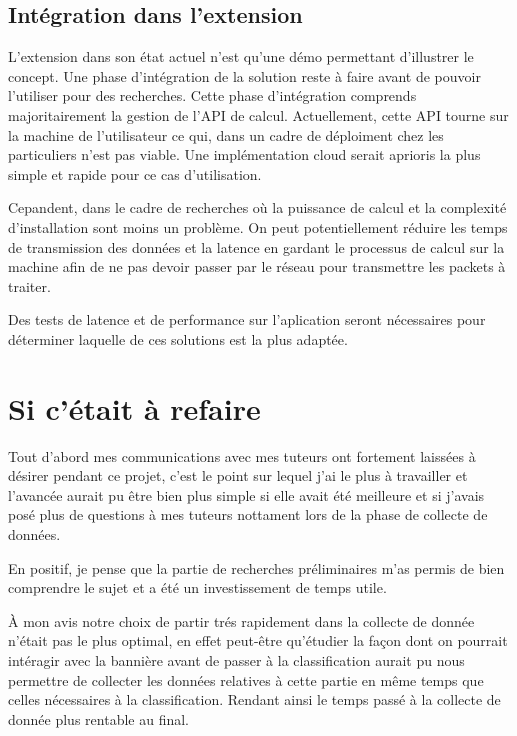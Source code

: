 \documentclass[oneside,a4paper,12pt]{article}
\begin{document}
	\subsection{Intégration dans l'extension}
	
	L'extension dans son état actuel n'est qu'une démo permettant d'illustrer le concept. Une phase d'intégration de la solution reste à faire avant de pouvoir l'utiliser pour des recherches.
	Cette phase d'intégration comprends majoritairement la gestion de l'API de calcul.
	Actuellement, cette API tourne sur la machine de l'utilisateur ce qui, dans un cadre de déploiment chez les particuliers n'est pas viable. Une implémentation cloud serait aprioris la plus simple et rapide pour ce cas d'utilisation.
	
	Cepandent, dans le cadre de recherches où la puissance de calcul et la complexité d'installation sont moins un problème. On peut potentiellement réduire les temps de transmission des données et la latence en gardant le processus de calcul sur la machine afin de ne pas devoir passer par le réseau pour transmettre les packets à traiter.
	
	Des tests de latence et de performance sur l'aplication seront nécessaires pour déterminer laquelle de ces solutions est la plus adaptée.
		
	\section{Si c'était à refaire}
	
	Tout d'abord mes communications avec mes tuteurs ont fortement laissées à désirer pendant ce projet, c'est le point sur lequel j'ai le plus à travailler et l'avancée aurait pu être bien plus simple si elle avait été meilleure et si j'avais posé plus de questions à mes tuteurs nottament lors de la phase de collecte de données.
	
	En positif, je pense que la partie de recherches préliminaires m'as permis de bien comprendre le sujet et a été un investissement de temps utile.
	
	\`A mon avis notre choix de partir trés rapidement dans la collecte de donnée n'était pas le plus optimal, en effet peut-être qu'étudier la façon dont on pourrait intéragir avec la bannière avant de passer à la classification aurait pu nous permettre de collecter les données relatives à cette partie en même temps que celles nécessaires à la classification. Rendant ainsi le temps passé à la collecte de donnée plus rentable au final.
	
\end{document}
